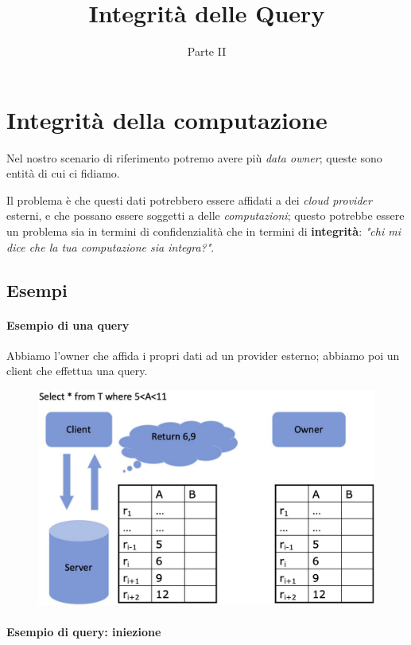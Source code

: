 \documentclass{report}
\title{\huge\textbf{{Integrità delle Query}}}
\date{Parte II}
\begin{document}
\maketitle

\tableofcontents
\newpage

\chapter{Integrità della computazione}

Nel nostro scenario di riferimento potremo avere più \textit{data owner}; queste 
sono entità di cui ci fidiamo.

\noindent Il problema è che questi dati potrebbero essere affidati a dei \textit{cloud provider} esterni, e che possano essere soggetti a delle \textit{computazioni};
questo potrebbe essere un problema sia in termini di confidenzialità che in termini di \textbf{integrità}: 
\textit{"chi mi dice che la tua computazione sia integra?"}.

\section{Esempi}

\subsubsection{Esempio di una query}

Abbiamo l'owner che affida i propri dati ad un provider esterno;
abbiamo poi un client che effettua una query.

\begin{figure}[H]
    \centering
    \includegraphics[width=0.7\linewidth]{images/ex1.png}
\end{figure}

\subsubsection{Esempio di query: iniezione}
\end{document}
